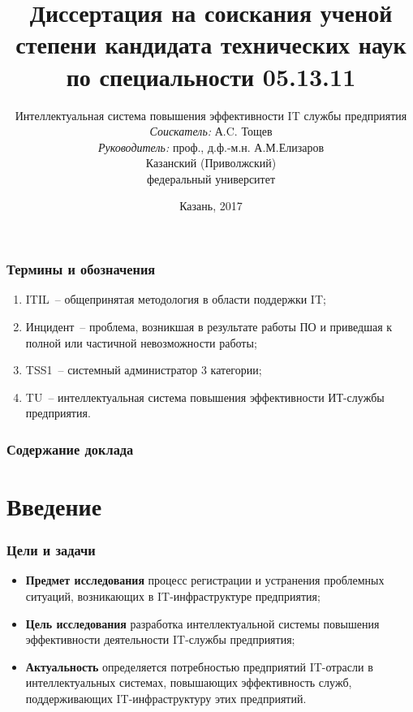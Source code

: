 \documentclass[14pt]{beamer}
\title{\small{Диссертация на соискания ученой степени кандидата технических наук по специальности 05.13.11}}
\author{
Интеллектуальная система повышения эффективности IT службы предприятия\\
\small{%
\emph{Соискатель:} А.C. Тощев\\%
\emph{Руководитель:} проф., д.ф.-м.н. А.М.Елизаров}\\%
\vspace{30pt}%
Казанский (Приволжский)\\
федеральный университет%
\vspace{20pt}%
}
\date{\small{Казань, 2017}}
\begin{document}
\maketitle


\begin{frame}
\frametitle{Термины и обозначения}
\begin{enumerate}
    \item ITIL~-- общепринятая методология в области поддержки IT;
    \item Инцидент~-- проблема, возникшая в результате работы ПО и приведшая к полной или частичной невозможности работы;
    \item TSS1~-- системный администратор 3 категории;
    \item TU~-- интеллектуальная система повышения эффективности ИТ-службы предприятия.
  
\end{enumerate}
\end{frame}


  \begin{frame}
   \frametitle{Содержание доклада}
    \tableofcontents
   \end{frame}


\AtBeginSection[] %
{
\begin{frame}
\frametitle{}
\tableofcontents[current]
	
\end{frame}
}
% 
%
\section[Введение]{Введение}

\begin{frame}
\frametitle{Цели и задачи}
\begin{itemize}
  \item \textbf{Предмет исследования} процесс регистрации и устранения проблемных ситуаций, возникающих в IT-инфраструктуре предприятия;
  \item \textbf{Цель исследования} разработка интеллектуальной системы повышения эффективности деятельности IT-службы предприятия;
  \item \textbf{Актуальность} определяется потребностью предприятий IT-отрасли в интеллектуальных системах, повышающих эффективность служб, поддерживающих IT-инфраструктуру этих предприятий.
\end{itemize}
\end{frame}
\end{document}
